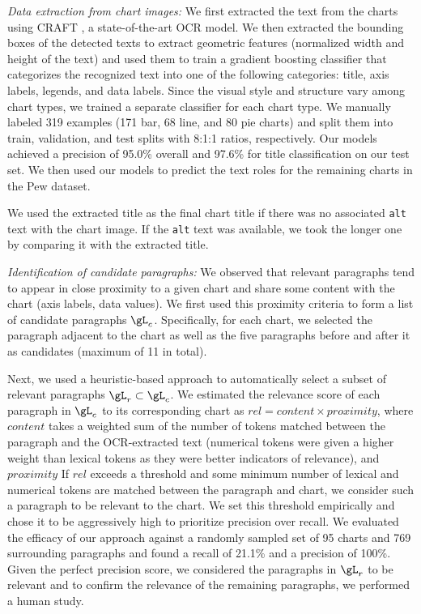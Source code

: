 \vspace{0.5em}
\noindent \Ni \textit{Data extraction from chart images: } We first extracted the text from the charts using CRAFT \cite{craftrecognition,craftdetection},  a state-of-the-art OCR model. We then  extracted the bounding boxes of the detected texts to extract geometric features (\eg normalized width and height of the text) and used them to train a gradient boosting classifier that categorizes the recognized text into one of the  following categories: title, axis labels, legends, and data labels. Since the visual style and structure vary among chart types, we trained a separate classifier for each chart type. We manually labeled 319 examples (171 bar, 68 line, and 80 pie charts) and split them into train, validation, and test splits with 8:1:1 ratios, respectively.
Our models achieved a precision of 95.0\%  overall and 97.6\% for title classification on our test set. We then used our models to predict the text roles for the remaining charts in the Pew dataset.


We used the extracted title as the final chart title if there was no associated \texttt{alt} text with the chart image. If the \texttt{alt} text was available, we took the longer one by comparing it with the extracted title. 



\vspace{0.5em}
\noindent \Nii \textit{Identification of candidate paragraphs:} We observed that relevant paragraphs tend to appear in close proximity to a given chart and share some content with the chart (\eg axis labels, data values). We first used this proximity criteria to form a list of candidate paragraphs $\gL_c$. Specifically, for each chart, we selected the paragraph adjacent to the chart as well as the five paragraphs before and after it as candidates (maximum of 11 in total). 


Next, we used a heuristic-based approach to automatically select a subset of relevant paragraphs $\gL_r \subset \gL_c$. 
We
estimated the relevance score of each paragraph in $\gL_c$ to its corresponding chart as $rel = content \times proximity$, where $content$ takes a weighted sum of the number of tokens matched between the paragraph and the OCR-extracted text (numerical tokens were given a higher weight than lexical tokens as they were better indicators of relevance), and $proximity$
If $rel$ exceeds a threshold and some minimum number of lexical and numerical tokens are matched between the paragraph and chart, we consider such a paragraph to be relevant to the chart.
We set this threshold empirically and chose it to be aggressively high to prioritize precision over recall.
We evaluated the efficacy of our approach against a randomly sampled set of 95 charts and 769 surrounding paragraphs and found a recall of 21.1\% and a precision of 100\%. Given the perfect precision score, we considered the paragraphs in $\gL_r$ to be relevant and to confirm the relevance of the remaining paragraphs, we performed a human study. 



